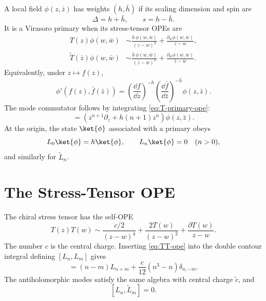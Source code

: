 A local field \(\phi(z,\bar z)\) has weights \((h,\bar h)\) if its scaling
dimension and spin are
\[
  \Delta=h+\bar h,
  \qquad
  s=h-\bar h.
\]
It is a Virasoro primary when its stress-tensor OPEs are
\begin{align}
  T(z)\phi(w,\bar w)
  &\sim
  \frac{h\,\phi(w,\bar w)}{(z-w)^2}
  +
  \frac{\partial_w\phi(w,\bar w)}{z-w},
  \label{eq:T-primary-ope}\\
  \widetilde T(\bar z)\phi(w,\bar w)
  &\sim
  \frac{\bar h\,\phi(w,\bar w)}{(\bar z-\bar w)^2}
  +
  \frac{\partial_{\bar w}\phi(w,\bar w)}{\bar z-\bar w}.
  \label{eq:Tbar-primary-ope}
\end{align}
Equivalently, under \(z\mapsto f(z)\),
\[
  \phi'(f(z),\bar f(\bar z))
  =
  \left(\frac{\dd f}{\dd z}\right)^{-h}
  \left(\frac{\dd\bar f}{\dd\bar z}\right)^{-\bar h}
  \phi(z,\bar z).
\]
The mode commutator follows by integrating \eqref{eq:T-primary-ope}:
\begin{equation}
  [L_n,\phi(z,\bar z)]
  =
  \left(z^{n+1}\partial_z+h(n+1)z^n\right)\phi(z,\bar z).
  \label{eq:Ln-primary-commutator}
\end{equation}
At the origin, the state \(\ket{\phi}\) associated with a primary obeys
\[
  L_0\ket{\phi}=h\ket{\phi},
  \qquad
  L_n\ket{\phi}=0\quad(n>0),
\]
and similarly for \(\widetilde L_n\).

\section{The Stress-Tensor OPE}

The chiral stress tensor has the self-OPE
\begin{equation}
  T(z)T(w)
  \sim
  \frac{c/2}{(z-w)^4}
  +
  \frac{2T(w)}{(z-w)^2}
  +
  \frac{\partial T(w)}{z-w}.
  \label{eq:TT-ope}
\end{equation}
The number \(c\) is the central charge.  Inserting
\eqref{eq:TT-ope} into the double contour integral defining
\([L_n,L_m]\) gives
\begin{equation}
  [L_n,L_m]
  =
  (n-m)L_{n+m}
  +
  \frac{c}{12}(n^3-n)\delta_{n,-m}.
  \label{eq:virasoro-algebra}
\end{equation}
The antiholomorphic modes satisfy the same algebra with central charge
\(\widetilde c\), and
\[
  [L_n,\widetilde L_m]=0.
\]

